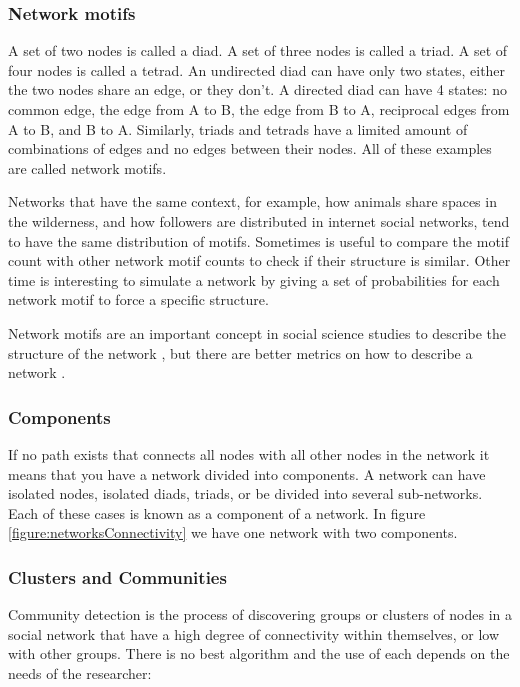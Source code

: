 \subsubsection{Network motifs}

A set of two nodes is called a diad. A set of three nodes is called a triad. A set of four nodes is called a tetrad. An undirected diad can have only two states, either the two nodes share an edge, or they don't. A directed diad can have 4 states: no common edge, the edge from A to B, the edge from B to A, reciprocal edges from A to B, and B to A. Similarly, triads and tetrads have a limited amount of combinations of edges and no edges between their nodes. All of these examples are called network motifs.

Networks that have the same context, for example, how animals share spaces in the wilderness, and how followers are distributed in internet social networks, tend to have the same distribution of motifs. Sometimes is useful to compare the motif count with other network motif counts to check if their structure is similar. Other time is interesting to simulate a network by giving a set of probabilities for each network motif to force a specific structure.

Network motifs are an important concept in social science studies to describe the structure of the network \cite{Faust2010}, but there are better metrics on how to describe a network \cite{Faust2007}.

\subsubsection{Components}

 If no path exists that connects all nodes with all other nodes in the network it means that you have a network divided into components. A network can have isolated nodes, isolated diads, triads, or be divided into several sub-networks. Each of these cases is known as a component of a network. In figure \ref{figure:networksConnectivity} we have one network with two components. 

\subsubsection{Clusters and Communities}

Community detection is the process of discovering groups or clusters of nodes in a social network that have a high degree of connectivity within themselves, or low with other groups. There is no best algorithm and the use of each depends on the needs of the researcher:

